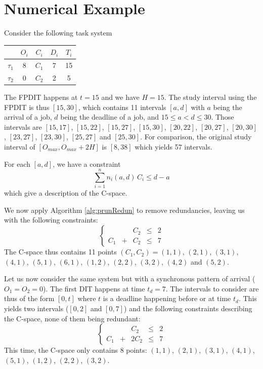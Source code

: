 \documentclass[conference]{IEEEtran}
\begin{document}
\section{Numerical Example}

Consider the following task system

    \begin{center}
    \begin{tabular}{|r|c|c|c|c|}
     \hline
      & $O_i$ & $C_i$ & $D_i$ & $T_i$ \\
     \hline
     $\tau_1$ & 8 & $C_1$ & 7 & 15\\
     \hline
     $\tau_2$ & 0 & $C_2$ & 2 & 5\\
     \hline
    \end{tabular}
    \end{center}

The FPDIT happens at $t=15$ and we have $H = 15$. The study interval using the FPDIT is thus $[15, 30]$, which contains 11 intervals $[a,d]$ with $a$ being the arrival of a job, $d$ being the deadline of a job, and $15 \leqslant a < d \leqslant 30$. Those intervals are
$[15, 17]$, $[15, 22]$, $[15, 27]$, $[15, 30]$, $[20, 22]$, $[20, 27]$, $[20, 30]$, $[23, 27]$, $[23, 30]$, $[25, 27]$ and $[25, 30]$. For comparison, the original study interval of $[O_{max}, O_{max} + 2H]$ is $[8, 38]$ which yields 57 intervals.

For each $[a, d]$, we have a constraint $$\sum_{i=1}^{n} n_i(a, d) \, C_i \leqslant d - a$$ which give a description of the C-space.

We now apply Algorithm \ref{alg:prunRedun} to remove redundancies, leaving us with the following constraints:
	\begin{equation}
		\left\{
			\begin{array}{ccccc}
				& & C_2 & \leqslant & 2 \\
				C_1 & + & C_2 & \leqslant & 7
			\end{array}
		\right.
	\end{equation}
The C-space thus contains 11 points $(C_1, C_2) = (1, 1)$, $(2, 1)$, $(3, 1)$, $(4, 1)$, $(5, 1)$, $(6, 1)$, $(1, 2)$, $(2, 2)$, $(3, 2)$, $(4, 2)$ and $(5, 2)$.

Let us now consider the same system but with a synchronous pattern of arrival ($O_1 = O_2 = 0$). The first DIT happens at time $t_d = 7$. The intervals to consider are thus of the form $[0, t]$ where $t$ is a deadline happening before or at time $t_d$. This yields two intervals ($[0, 2]$ and $[0, 7]$) and the following constraints describing the C-space, none of them being redundant:
$$
\left\{
  \begin{array}{ccccc}
    & & C_2 & \leqslant & 2 \\
    C_1 & + & 2 C_2 & \leqslant & 7
  \end{array}
\right.
$$
This time, the C-space only contains 8 points: $(1, 1)$, $(2, 1)$, $(3, 1)$, $(4, 1)$, $(5, 1)$, $(1, 2)$, $(2, 2)$, $(3, 2)$.
\end{document}
